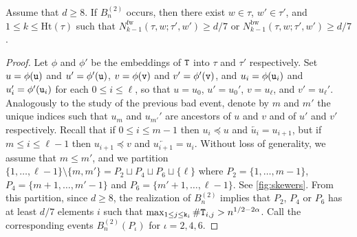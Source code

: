 \documentclass[11pt,reqno]{amsart}
\newcommand{\Ht}{\mathrm{Ht}}
\newcommand{\fw}{\mathrm{fw}}
\newcommand{\bw}{\mathrm{bw}}
\begin{document}
\begin{lem}
\label{deter-lemma:no_skewers}
Assume that $d\geq 8$. If $B_n^{(2)}$ occurs, then there exist $w \in \tau$, $w' \in \tau'$, and $1 \leq k \leq \Ht(\tau)$ such that $N_{k-1}^{\fw}(\tau,w;\tau',w')\geq d/7$ or $N_{k-1}^{\bw}(\tau,w;\tau',w')\geq d/7$.
\end{lem}

\begin{proof}
Let $\phi$ and $\phi'$ be the embeddings of $\mathtt{T}$ into $\tau$ and $\tau'$ respectively. Set $u=\phi(\mathtt{u})$ and $u'=\phi'(\mathtt{u})$, $v=\phi(\mathtt{v})$ and $v'=\phi'(\mathtt{v})$, and $u_i=\phi(\mathtt{u}_i)$ and $u_i'=\phi'(\mathtt{u}_i)$ for each $0\leq i\leq \ell$, so that $u=u_0$, $u'=u_0'$, $v=u_\ell$, and $v'=u_\ell'$. Analogously to the study of the previous bad event, denote by $m$ and $m'$ the unique indices such that $u_m$ and $u_{m'}'$ are ancestors of $u$ and $v$ and of $u'$ and $v'$ respectively. Recall that if $0\leq i\leq m-1$ then $u_i\preceq u$ and $\overleftarrow{u_i}=u_{i+1}$, but if $m\leq i\leq \ell-1$ then $u_{i+1}\preceq v$ and $\overleftarrow{u_{i+1}}=u_i$. Without loss of generality, we assume that $m \leq m'$, and we partition $\{1, \dots, \ell-1\}\setminus \{m,m'\} = P_2 \sqcup P_4 \sqcup P_6 \sqcup \{\ell\}$ where $P_2 = \{1, \dots, m-1\}$, $P_4 = \{m+1, \dots, m'-1\}$ and $P_6 = \{m'+1, \dots, \ell-1\}$. See \cref{fig:skewers}. From this partition, since $d\ge 8$, the realization of $B_n^{(2)}$ implies that $P_2$, $P_4$ or $P_6$ has at least $d/7$ elements $i$ such that $\max_{1\leq j\leq \mathtt{k}_i}\#\mathtt{T}_{i,j}>n^{1/2-2\alpha}$. Call the corresponding events $B_n^{(2)}(P_\iota)$ for $\iota=2,4,6$.


\end{proof}
\end{document}

